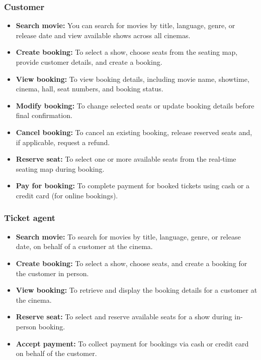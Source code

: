 \subsubsection{Customer}\label{_Y6YzRRWTz99R6c_8D5mq}

\begin{itemize}
\item
\protect{}\label{4S8o_hPdPwDqZcm7Atvsj}
\textbf{Search movie:} You can search for movies by title, language, genre, or release date and view available shows across all cinemas.
\item
\protect{}\label{f3gX5W3xkG7tnT9nM5iDd}
\textbf{Create booking:} To select a show, choose seats from the seating map, provide customer details, and create a booking.
\item
\protect{}\label{tfexOIdPJHugVdQ7tsOH7}
\textbf{View booking:} To view booking details, including movie name, showtime, cinema, hall, seat numbers, and booking status.
\item
\protect{}\label{lfL7wFkKYIm-e3FQA1b0c}
\textbf{Modify booking:} To change selected seats or update booking details before final confirmation.
\item
\protect{}\label{EFwoTpjSHk3UoSD8mWdOf}
\textbf{Cancel booking:} To cancel an existing booking, release reserved seats and, if applicable, request a refund.
\item
\protect{}\label{y9473rcLTUcVSy34FN-s7}
\textbf{Reserve seat:} To select one or more available seats from the real-time seating map during booking.
\item
\protect{}\label{Vfi7-eceneZkBbyKqzNhk}
\textbf{Pay for booking:} To complete payment for booked tickets using cash or a credit card (for online bookings).
\end{itemize}

\subsubsection{Ticket agent}\label{Gz1uJtlzFRiNA5tj9jdiG}

\begin{itemize}
\item
\protect{}\label{FNpsmsfpSSi1V3Gi_O8wk}
\textbf{Search movie:} To search for movies by title, language, genre, or release date, on behalf of a customer at the cinema.
\item
\protect{}\label{ZIJIL6VOLkiCp_Bnygo-l}
\textbf{Create booking:} To select a show, choose seats, and create a booking for the customer in person.
\item
\protect{}\label{LqgRAobSnUZEU7oFYYdce}
\textbf{View booking:} To retrieve and display the booking details for a customer at the cinema.
\item
\protect{}\label{A8GjUOJTJwgFThNLjrzKG}
\textbf{Reserve seat:} To select and reserve available seats for a show during in-person booking.
\item
\protect{}\label{oyY4f0Z_ggh6FnFw6x8pb}
\textbf{Accept payment:} To collect payment for bookings via cash or credit card on behalf of the customer.
\end{itemize}

